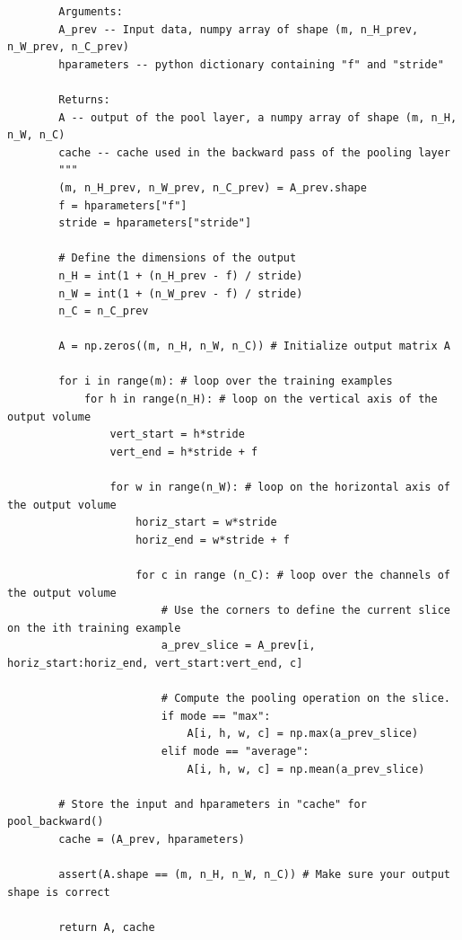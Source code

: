 \documentclass[11pt, a4paper]{article}
\begin{document}
\begin{spacing}{1.1}
\begin{lstlisting}
		Arguments:
		A_prev -- Input data, numpy array of shape (m, n_H_prev, n_W_prev, n_C_prev)
		hparameters -- python dictionary containing "f" and "stride"
				
		Returns:
		A -- output of the pool layer, a numpy array of shape (m, n_H, n_W, n_C)
		cache -- cache used in the backward pass of the pooling layer 
		"""
		(m, n_H_prev, n_W_prev, n_C_prev) = A_prev.shape
		f = hparameters["f"]
		stride = hparameters["stride"]
		
		# Define the dimensions of the output
		n_H = int(1 + (n_H_prev - f) / stride)
		n_W = int(1 + (n_W_prev - f) / stride)
		n_C = n_C_prev
		
		A = np.zeros((m, n_H, n_W, n_C)) # Initialize output matrix A              
		
		for i in range(m): # loop over the training examples
			for h in range(n_H): # loop on the vertical axis of the output volume
				vert_start = h*stride
				vert_end = h*stride + f
				
				for w in range(n_W): # loop on the horizontal axis of the output volume
					horiz_start = w*stride
					horiz_end = w*stride + f
					
					for c in range (n_C): # loop over the channels of the output volume
						# Use the corners to define the current slice on the ith training example
						a_prev_slice = A_prev[i, horiz_start:horiz_end, vert_start:vert_end, c]
						
						# Compute the pooling operation on the slice. 
						if mode == "max":
							A[i, h, w, c] = np.max(a_prev_slice)
						elif mode == "average":
							A[i, h, w, c] = np.mean(a_prev_slice)
		
		# Store the input and hparameters in "cache" for pool_backward()
		cache = (A_prev, hparameters)
		
		assert(A.shape == (m, n_H, n_W, n_C)) # Make sure your output shape is correct
		
		return A, cache	\end{lstlisting} \newpage


\end{spacing}
\end{document}
